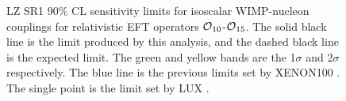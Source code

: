\begin{figure}[!htbp]
\caption{LZ SR1 90\% CL sensitivity limits for isoscalar WIMP-nucleon couplings for relativistic EFT operators $\operatorname{\mathcal{O}}_{10}$-$\operatorname{\mathcal{O}}_{15}$.
         The solid black line is the limit produced by this analysis, and the dashed black line is the expected limit. 
         The green and yellow bands are the 1$\sigma$ and 2$\sigma$ respectively.
         The blue line is the previous limits set by XENON100 \cite{xenon100_eft_ref}.
         The single point is the limit set by LUX \cite{LUX_RUN4_EFT_2021}.}
\label{fig:EFT_Result_SR1_Sensitivity_2}
\end{figure}